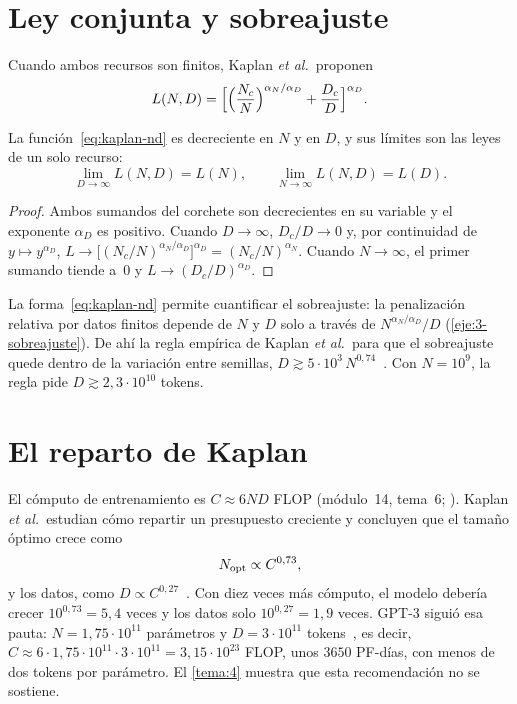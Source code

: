 \section{Ley conjunta y sobreajuste}

Cuando ambos recursos son finitos, Kaplan \emph{et al.}\ proponen~\cite[ecuación~(1.5) y §4]{kaplan}
\begin{equation}\label{eq:kaplan-nd}
L(N,D)=\Bigl[\Bigl(\frac{N_c}{N}\Bigr)^{\alpha_N/\alpha_D}+\frac{D_c}{D}\Bigr]^{\alpha_D}.
\end{equation}

\begin{proposicion}\label{prop:limites}
La función~\eqref{eq:kaplan-nd} es decreciente en $N$ y en $D$, y sus límites son las leyes de un solo recurso:
\[
\lim_{D\to\infty}L(N,D)=L(N),\qquad\lim_{N\to\infty}L(N,D)=L(D).
\]
\end{proposicion}

\begin{proof}
Ambos sumandos del corchete son decrecientes en su variable y el exponente $\alpha_D$ es positivo. Cuando $D\to\infty$, $D_c/D\to 0$ y, por continuidad de $y\mapsto y^{\alpha_D}$, $L\to\bigl[(N_c/N)^{\alpha_N/\alpha_D}\bigr]^{\alpha_D}=(N_c/N)^{\alpha_N}$. Cuando $N\to\infty$, el primer sumando tiende a~$0$ y $L\to(D_c/D)^{\alpha_D}$.
\end{proof}

La forma~\eqref{eq:kaplan-nd} permite cuantificar el sobreajuste: la penalización relativa por datos finitos depende de $N$ y $D$ solo a través de $N^{\alpha_N/\alpha_D}/D$ (\cref{eje:3-sobreajuste}). De ahí la regla empírica de Kaplan \emph{et al.}\ para que el sobreajuste quede dentro de la variación entre semillas, $D\gtrsim 5\cdot 10^{3}\,N^{0{,}74}$~\cite[ecuación~(4.4)]{kaplan}. Con $N=10^{9}$, la regla pide $D\gtrsim 2{,}3\cdot 10^{10}$ tokens.

\section{El reparto de Kaplan}

El cómputo de entrenamiento es $C\approx 6ND$ FLOP (módulo~14, tema~6; \cite[§2.1]{kaplan}). Kaplan \emph{et al.}\ estudian cómo repartir un presupuesto creciente y concluyen que el tamaño óptimo crece como~\cite[ecuación~(6.1)]{kaplan}
\[
N_{\mathrm{opt}}\propto C^{0{,}73},
\]
y los datos, como $D\propto C^{0{,}27}$~\cite[§1.1]{kaplan}. Con diez veces más cómputo, el modelo debería crecer $10^{0{,}73}=5{,}4$ veces y los datos solo $10^{0{,}27}=1{,}9$ veces. GPT-3 siguió esa pauta: $N=1{,}75\cdot 10^{11}$ parámetros y $D=3\cdot 10^{11}$ tokens~\cite{brown}, es decir, $C\approx 6\cdot 1{,}75\cdot 10^{11}\cdot 3\cdot 10^{11}=3{,}15\cdot 10^{23}$ FLOP, unos $3650$ PF-días, con menos de dos tokens por parámetro. El \cref{tema:4} muestra que esta recomendación no se sostiene.

